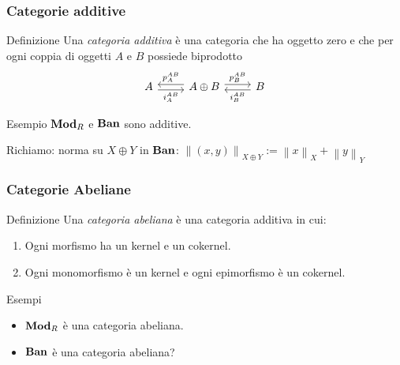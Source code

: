 \documentclass{beamer}
\begin{document}
\begin{frame}[fragile]
  \frametitle{Categorie additive}
  \begin{block}{Definizione}
    Una {\em categoria additiva} è una categoria che ha oggetto zero e
    che per ogni coppia di oggetti \(A\) e \(B\) possiede biprodotto
    \[
      \begin{tikzcd}
        A \ar["{i_A^{AB}}", r, shift right, swap] & A \oplus B
        \ar["{p_A^{AB}}", l, shift right, swap] \ar["{p_B^{AB}}", r,
        shift left] & B \ar["{i_B^{AB}}", l, shift left]
      \end{tikzcd}
    \]
  \end{block}
  
  \begin{block}{Esempio}
    \(\mathbf{Mod}_R\) e \(\mathbf{Ban}\) sono additive.
  \end{block}

  Richiamo: norma su \(X \oplus Y\) in \(\mathbf{Ban}\):
  \(\left\lVert (x,y) \right\rVert_{X \oplus Y} := \left\lVert x
  \right\rVert_X + \left\lVert y \right\rVert_Y\)
\end{frame}

\begin{frame}
  \frametitle{Categorie Abeliane}
  \begin{block}{Definizione}
    Una {\em categoria abeliana} è una categoria additiva in cui:
    \begin{enumerate}
    \item Ogni morfismo ha un kernel e un cokernel.
    \item Ogni monomorfismo è un kernel e ogni epimorfismo è un
      cokernel.
    \end{enumerate}
  \end{block}

  \begin{block}{Esempi}
    \begin{itemize}
    \item \(\mathbf{Mod}_R\) è una categoria abeliana.
    \item \(\mathbf{Ban}\) è una categoria abeliana?
    \end{itemize}
  \end{block}
  
\end{frame}
\end{document}
